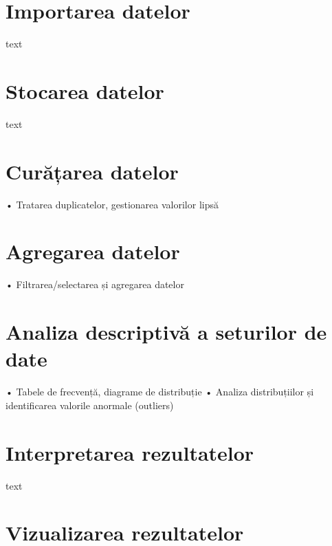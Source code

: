 \documentclass[
  11pt,
  b5paper,
  nottoc]{book}
\begin{document}
\hypertarget{importarea-datelor}{%
\section{Importarea datelor}\label{importarea-datelor}}

text

\hypertarget{stocarea-datelor}{%
\section{Stocarea datelor}\label{stocarea-datelor}}

text

\hypertarget{curux103ux21barea-datelor}{%
\section{Curățarea datelor}\label{curux103ux21barea-datelor}}

• Tratarea duplicatelor, gestionarea valorilor lipsă

\hypertarget{agregarea-datelor}{%
\section{Agregarea datelor}\label{agregarea-datelor}}

• Filtrarea/selectarea și agregarea datelor

\hypertarget{analiza-descriptivux103-a-seturilor-de-date}{%
\section{Analiza descriptivă a seturilor de
date}\label{analiza-descriptivux103-a-seturilor-de-date}}

• Tabele de frecvență, diagrame de distribuție • Analiza distribuțiilor
și identificarea valorile anormale (outliers)

\hypertarget{interpretarea-rezultatelor}{%
\section{Interpretarea rezultatelor}\label{interpretarea-rezultatelor}}

text

\hypertarget{vizualizarea-rezultatelor}{%
\section{Vizualizarea rezultatelor}\label{vizualizarea-rezultatelor}}
\end{document}
